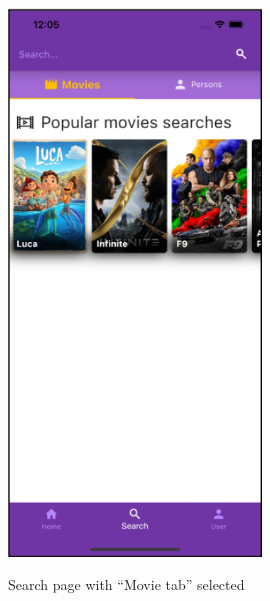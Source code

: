 \documentclass[12pt, a4paper]{article}
\numberwithin{figure}{section}
\begin{document}
\begin{center}
	\begin{minipage}[t]{0.4\textwidth}
		\begin{figure}[H]
			\centering
			\includegraphics[width=0.6\textwidth]{images/final/search.png}\\
			\caption{Search page with “Movie tab” selected}
		\end{figure}
	\end{minipage}
	\hspace{0.015\linewidth}
	\begin{minipage}[t]{0.4\textwidth}
		\begin{figure}[H]
			\centering

\end{figure}
\end{minipage}
\end{center}
\end{document}
